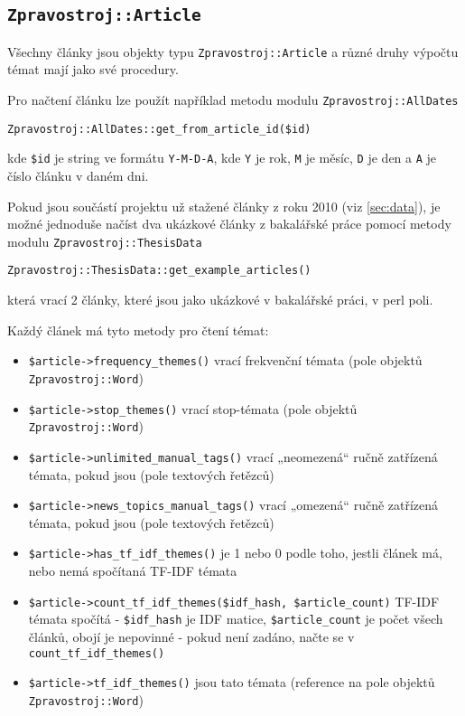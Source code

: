 \documentclass[12pt,a4paper]{report}
\def\uv#1{„#1“}
\begin{document}
\subsection{\texttt{Zpravostroj::Article}}

Všechny články jsou objekty typu \texttt{Zpravostroj::Article} a různé druhy výpočtu témat mají jako své procedury.

Pro načtení článku lze použít například metodu modulu \texttt{Zpravostroj::AllDates} 
\begin{lstlisting}
Zpravostroj::AllDates::get_from_article_id($id)
\end{lstlisting}
kde \texttt{\$id} je string ve formátu \texttt{Y-M-D-A}, kde \texttt{Y} je rok, \texttt{M} je měsíc, \texttt{D} je den a \texttt{A} je číslo článku v daném dni. 

Pokud jsou součástí projektu už stažené články z roku 2010 (viz \ref{sec:data}), je možné jednoduše načíst dva ukázkové články z bakalářské práce pomocí metody modulu \texttt{Zpravostroj::ThesisData} 
\begin{lstlisting}
Zpravostroj::ThesisData::get_example_articles()
\end{lstlisting}
která vrací 2 články, které jsou jako ukázkové v bakalářské práci, v perl poli.

Každý článek má tyto metody pro čtení témat:

\begin{itemize}
	\item \texttt{\$article->frequency\_themes()} vrací frekvenční témata (pole objektů \texttt{Zpravostroj::Word})
	\item \texttt{\$article->stop\_themes()} vrací stop-témata (pole objektů \texttt{Zpravostroj::Word})
	\item \texttt{\$article->unlimited\_manual\_tags()} vrací \uv{neomezená} ručně zatřízená témata, pokud jsou (pole textových řetězců)
	\item \texttt{\$article->news\_topics\_manual\_tags()} vrací \uv{omezená} ručně zatřízená témata, pokud jsou (pole textových řetězců)
	\item \texttt{\$article->has\_tf\_idf\_themes()} je 1 nebo 0 podle toho, jestli článek má, nebo nemá spočítaná TF-IDF témata
	\item \texttt{\$article->count\_tf\_idf\_themes(\$idf\_hash, \$article\_count)} TF-IDF témata spočítá - \texttt{\$idf\_hash} je IDF matice, \texttt{\$article\_count} je počet všech článků, obojí je nepovinné - pokud není zadáno, načte se v \texttt{count\_tf\_idf\_themes()}
	\item \texttt{\$article->tf\_idf\_themes()} jsou tato témata (reference na pole objektů \texttt{Zpravostroj::Word})
\end{itemize}
	
\end{document}
